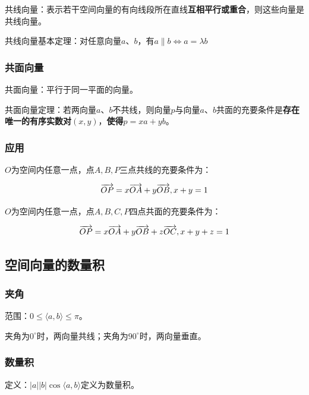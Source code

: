 \documentclass{ctexart}
\begin{document}
共线向量：表示若干空间向量的有向线段所在直线\textbf{互相平行或重合}，则这些向量是共线向量。

共线向量基本定理：对任意向量\textbf{$a$}、\textbf{$b$}，有$a\parallel b\Longleftrightarrow a=\lambda b$

\subsubsection{共面向量}

共面向量：平行于同一平面的向量。

共面向量定理：若两向量\textbf{$a$}、\textbf{$b$}不共线，则向量\textbf{$p$}与向量\textbf{$a$}、\textbf{$b$}共面的充要条件是\textbf{存在唯一的有序实数对$(x,y)$}，\textbf{使得$p=xa+yb$}。

\subsubsection{应用}

$O$为空间内任意一点，点$A,B,P$三点共线的充要条件为：

\begin{equation*}
    \centering
    \overrightarrow{OP}=x\overrightarrow{OA}+y\overrightarrow{OB},x+y=1
\end{equation*}

$O$为空间内任意一点，点$A,B,C,P$四点共面的充要条件为：

\begin{equation*}
    \centering
    \overrightarrow{OP}=x\overrightarrow{OA}+y\overrightarrow{OB}+z\overrightarrow{OC},x+y+z=1
\end{equation*}

\subsection{空间向量的数量积}

\subsubsection{夹角}

范围：$0\leq \langle a,b\rangle \leq \pi$。

夹角为$0^{\circ}$时，两向量共线；夹角为$90^{\circ}$时，两向量垂直。

\subsubsection{数量积}

定义：$\left|a\right|\left|b\right|\cos\langle a,b\rangle$定义为数量积。
\end{document}
